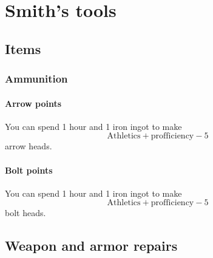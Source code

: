 \chapter{Smith's tools}

\section{Items}

\subsection{Ammunition}

\subsubsection{Arrow points}

You can spend 1 hour and 1 iron ingot to make $$\mathrm{Athletics} + \mathrm{profficiency} - 5$$ arrow heads.

\subsubsection{Bolt points}

You can spend 1 hour and 1 iron ingot to make $$\mathrm{Athletics} + \mathrm{profficiency} - 5$$ bolt heads.

\section{Weapon and armor repairs}